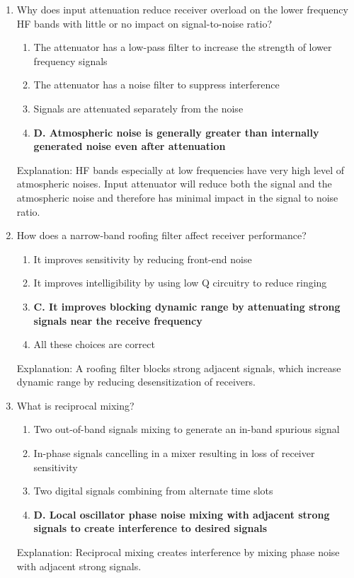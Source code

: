 \begin{enumerate}
  \item Why does input attenuation reduce receiver overload on the lower frequency HF bands with little or no impact on signal-to-noise ratio?
     \begin{enumerate}
      \item  The attenuator has a low-pass filter to increase the strength of lower frequency signals
         \item  The attenuator has a noise filter to suppress interference
       \item  Signals are attenuated separately from the noise
        \item \textbf{D. Atmospheric noise is generally greater than internally generated noise even after attenuation}
        \end{enumerate}
       \textcolor{myred}{Explanation:}
    HF bands especially at low frequencies have very high level of atmospheric noises. Input attenuator will reduce both the signal and the atmospheric noise and therefore has minimal impact in the signal to noise ratio.

        \item How does a narrow-band roofing filter affect receiver performance?
       \begin{enumerate}
     \item  It improves sensitivity by reducing front-end noise
      \item  It improves intelligibility by using low Q circuitry to reduce ringing
    \item \textbf{C. It improves blocking dynamic range by attenuating strong signals near the receive frequency}
        \item  All these choices are correct
    \end{enumerate}
     \textcolor{myred}{Explanation:}
        A roofing filter blocks strong adjacent signals, which increase dynamic range by reducing desensitization of receivers.
        
         \item What is reciprocal mixing?
       \begin{enumerate}
         \item  Two out-of-band signals mixing to generate an in-band spurious signal
          \item  In-phase signals cancelling in a mixer resulting in loss of receiver sensitivity
         \item  Two digital signals combining from alternate time slots
        \item \textbf{D. Local oscillator phase noise mixing with adjacent strong signals to create interference to desired signals}
       \end{enumerate}
      \textcolor{myred}{Explanation:}
     Reciprocal mixing creates interference by mixing phase noise with adjacent strong signals.


\end{enumerate}
